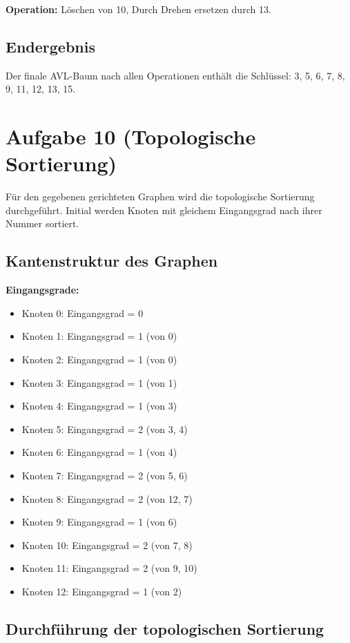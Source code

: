 \documentclass[a4paper,12pt]{article}
\begin{document}
\textbf{Operation:} Löschen von 10, Durch Drehen ersetzen durch 13.

\subsection*{Endergebnis}

Der finale AVL-Baum nach allen Operationen enthält die Schlüssel: 3, 5, 6, 7, 8, 9, 11, 12, 13, 15.

\newpage

\section*{Aufgabe 10 (Topologische Sortierung)}

Für den gegebenen gerichteten Graphen wird die topologische Sortierung durchgeführt.
Initial werden Knoten mit gleichem Eingangsgrad nach ihrer Nummer sortiert.

\subsection*{Kantenstruktur des Graphen}

\textbf{Eingangsgrade:}
\begin{itemize}
    \item Knoten 0: Eingangsgrad = 0
    \item Knoten 1: Eingangsgrad = 1 (von 0)
    \item Knoten 2: Eingangsgrad = 1 (von 0)
    \item Knoten 3: Eingangsgrad = 1 (von 1)
    \item Knoten 4: Eingangsgrad = 1 (von 3)
    \item Knoten 5: Eingangsgrad = 2 (von 3, 4)
    \item Knoten 6: Eingangsgrad = 1 (von 4)
    \item Knoten 7: Eingangsgrad = 2 (von 5, 6)
    \item Knoten 8: Eingangsgrad = 2 (von 12, 7)
    \item Knoten 9: Eingangsgrad = 1 (von 6)
    \item Knoten 10: Eingangsgrad = 2 (von 7, 8)
    \item Knoten 11: Eingangsgrad = 2 (von 9, 10)
    \item Knoten 12: Eingangsgrad = 1 (von 2)
\end{itemize}

\subsection*{Durchführung der topologischen Sortierung}
\end{document}
